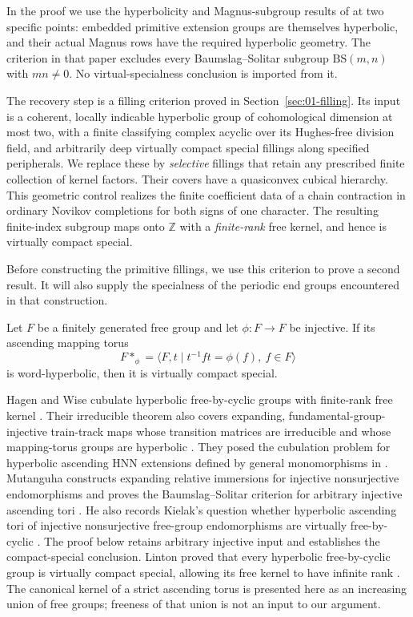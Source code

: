 In the proof we use the hyperbolicity and Magnus-subgroup results of
\cite{OpenAIHyperbolicity} at two specific points: embedded primitive
extension groups are themselves hyperbolic, and their actual Magnus
rows have the required hyperbolic geometry. The criterion in that paper
excludes every Baumslag--Solitar subgroup $\mathrm{BS}(m,n)$ with
$mn\ne0$. No virtual-specialness conclusion is imported from it.

The recovery step is a filling criterion proved in
Section~\ref{sec:01-filling}. Its input is a coherent, locally indicable
hyperbolic group of cohomological dimension at most two, with a finite
classifying complex acyclic over its Hughes-free division field, and
arbitrarily deep virtually compact special fillings along specified
peripherals. We replace these by \emph{selective} fillings that retain
any prescribed finite collection of kernel factors. Their covers have
a quasiconvex cubical hierarchy. This geometric control realizes the
finite coefficient data of a chain contraction in ordinary Novikov
completions for both signs of one character. The resulting
finite-index subgroup maps onto $\mathbb Z$ with a \emph{finite-rank}
free kernel, and hence is virtually compact special.

Before constructing the primitive fillings, we use this criterion to
prove a second result. It will also supply the specialness of the
periodic end groups encountered in that construction.

\begin{theorem}\label{thm:ascending-intro}
Let $F$ be a finitely generated free group and let $\phi:F\to F$ be injective. If its ascending mapping torus
\[
F*_{\phi}=\langle F,t\mid t^{-1}ft=\phi(f),\ f\in F\rangle
\]
is word-hyperbolic, then it is virtually compact special.
\end{theorem}

Hagen and Wise cubulate hyperbolic free-by-cyclic groups with finite-rank
free kernel \cite[Theorem~A]{HagenWise2016}. Their irreducible theorem also covers expanding,
fundamental-group-injective train-track maps whose transition matrices
are irreducible and whose mapping-torus groups are hyperbolic
\cite[Theorem~B]{HagenWise2015}. They posed the cubulation
problem for hyperbolic ascending HNN extensions defined by general
monomorphisms in \cite[Problem~C]{HagenWise2016}.
Mutanguha constructs expanding relative immersions for injective
nonsurjective endomorphisms and proves the
Baumslag--Solitar criterion for arbitrary injective ascending tori
\cite[Theorems~4.5 and~6.7]{Mutanguha2021Dynamics}.
He also records Kielak's question whether hyperbolic ascending tori of
injective nonsurjective free-group endomorphisms are virtually
free-by-cyclic \cite[Overview, p.~3, Question (Virtual fibering)]{Mutanguha2021Dynamics}.
The proof below retains arbitrary injective input and establishes the
compact-special conclusion. Linton proved that every
hyperbolic free-by-cyclic group is virtually compact special, allowing
its free kernel to have infinite rank
\cite[Corollary~1.5]{Linton2026Embedding}. The canonical kernel of a
strict ascending torus is presented here as an increasing union of
free groups; freeness of that union is not an input to our argument.

